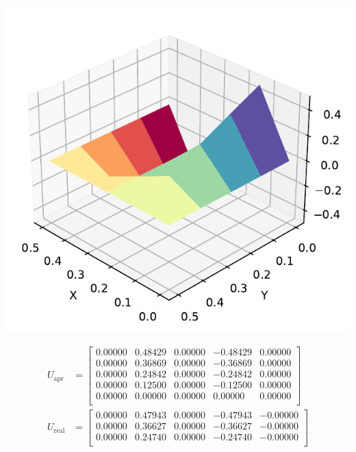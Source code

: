 \documentclass[a4paper, 11pt]{report}
\begin{document}
\begin{enumerate}[leftmargin=*]
    \begin{minipage}{0.35\columnwidth}
        \includegraphics[width=\columnwidth]{../edp/12.3_2.pdf}
    \end{minipage}
    \begin{minipage}{0.6\columnwidth}
        \begin{align*}
            U_{\text{apr}} &= 
            \begin{bmatrix}
                0.00000 &   0.48429  & 0.00000  & -0.48429  & 0.00000\\ 
                0.00000 &   0.36869  & 0.00000  & -0.36869  & 0.00000\\ 
                0.00000 &   0.24842  & 0.00000  & -0.24842  & 0.00000\\ 
                0.00000 &   0.12500  & 0.00000  & -0.12500  & 0.00000\\ 
                0.00000 &   0.00000  & 0.00000  &  0.00000  & 0.00000\\
            \end{bmatrix}\\
            U_{\text{real}} &=
            \begin{bmatrix}
                0.00000 &  0.47943 &  0.00000 &  -0.47943  & -0.00000  \\
                0.00000 &  0.36627 &  0.00000 &  -0.36627  & -0.00000  \\
                0.00000 &  0.24740 &  0.00000 &  -0.24740  & -0.00000  \\

\end{bmatrix}
\end{align*}
\end{minipage}
\end{enumerate}
\end{document}
